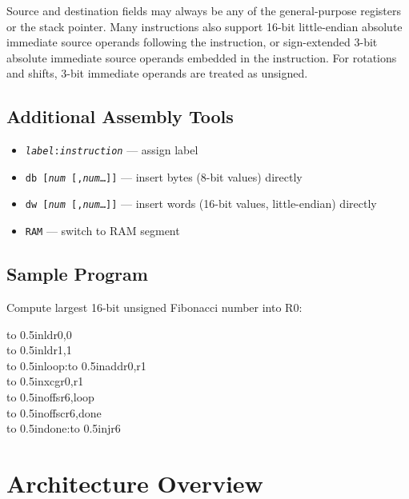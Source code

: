 \documentclass[11pt]{book}
\begin{document}
\noindent
Source and destination fields may always be any
of the general-purpose registers or the stack pointer.
Many instructions also support
16-bit little-endian absolute immediate source operands
following the instruction,
or sign-extended 3-bit absolute immediate source operands
embedded in the instruction.
For rotations and shifts,
3-bit immediate operands are treated as unsigned.

\section*{Additional Assembly Tools}
\begin{itemize}
\item \texttt{\textit{label}:\@ \textit{instruction}} --- assign label
\item \texttt{db [\textit{num} [,\textit{num}\dots]]} ---
  insert bytes (8-bit values) directly
\item \texttt{dw [\textit{num} [,\textit{num}\dots]]} ---
  insert words (16-bit values, little-endian) directly
\item \texttt{RAM} --- switch to RAM segment
\end{itemize}

\section*{Sample Program}
\noindent Compute largest 16-bit unsigned Fibonacci number into R0:

{\noindent\ttfamily\selectfont\small
\null\hspace{0.5in}\hbox to 0.5in{ld\hss}r0,0\\
\null\hspace{0.5in}\hbox to 0.5in{ld\hss}r1,1\\
\null\hbox to 0.5in{loop:\hss}\hbox to 0.5in{add\hss}r0,r1\\
\null\hspace{0.5in}\hbox to 0.5in{xcg\hss}r0,r1\\
\null\hspace{0.5in}\hbox to 0.5in{offs\hss}r6,loop\\
\null\hspace{0.5in}\hbox to 0.5in{offsc\hss}r6,done\\
\null\hbox to 0.5in{done:\hss}\hbox to 0.5in{j\hss}r6}

\mainmatter
\chapter{Architecture Overview}
\end{document}
